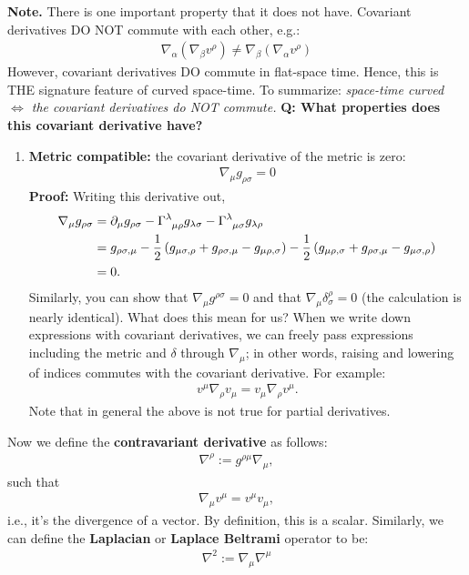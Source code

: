 \documentclass[11pt]{article}
\theoremstyle{definition}
\begin{document}
\textbf{Note.} There is one important property that it does not have. Covariant derivatives DO NOT commute with each other, e.g.: 
\begin{align*}
	\nabla_\alpha ( \nabla_\beta v^\rho ) \neq \nabla_\beta (\nabla_\alpha v^\rho ) 
\end{align*}
However, covariant derivatives DO commute in flat-space time. Hence, this is THE signature feature of curved space-time. To summarize: \emph{space-time curved \( \iff \) the covariant derivatives do NOT commute.}
\newline
\newline
\textbf{Q: What properties does this covariant derivative have?}
\begin{enumerate}[noitemsep]
	\item \textbf{Metric compatible:} the covariant derivative of the metric is zero:
	\begin{align*}
		\nabla_\mu g_{\rho \sigma} = 0 
	\end{align*}
	\textbf{Proof:} Writing this derivative out, 
	\begin{align*}
		\nabla_\mu g_{\rho \sigma} & = \partial_\mu g_{\rho \sigma} - \tensor{\Gamma}{^{\lambda}_{\mu \rho}} g_{\lambda \sigma} - \tensor{\Gamma}{^{\lambda}_{\mu \sigma}} g_{\lambda \rho} \\
		& = g_{\rho \sigma, \mu} - \frac{1}{2} \left( g_{\mu \sigma, \rho} + g_{\rho \sigma, \mu} - g_{\mu \rho, \sigma} \right) - \frac{1}{2} \left( g_{\mu \rho, \sigma} + g_{\rho \sigma, \mu} - g_{\mu \sigma, \rho}  \right) \\
		& = 0.
	\end{align*}
	Similarly, you can show that \( \nabla_{\mu} g^{\rho \sigma} = 0 \) and that \( \nabla_\mu \delta_\sigma^\rho = 0 \) (the calculation is nearly identical). What does this mean for us? When we write down expressions with covariant derivatives, we can freely pass expressions including the metric and \( \delta \) through \( \nabla_\mu \); in other words, raising and lowering of indices commutes with the covariant derivative. For example: 
	\begin{align*}
		v^\mu \nabla_\rho v_\mu = v_\mu \nabla_\rho v^\mu.
	\end{align*} 
	Note that in general the above is not true for partial derivatives. 
\end{enumerate}
Now we define the \textbf{contravariant derivative} as follows: 
\begin{align}\label{defn:contravariant}
	\nabla^\rho := g^{\rho \mu} \nabla_\mu, 
\end{align}
such that
\begin{align*}
	\nabla_\mu v^\mu = v^\mu v_\mu,
\end{align*}
i.e., it's the divergence of a vector. By definition, this is a scalar. Similarly, we can define the \textbf{Laplacian} or \textbf{Laplace Beltrami} operator to be:
\begin{align*}
	\nabla^2 := \nabla_\mu \nabla^\mu 
\end{align*}
\end{document}
